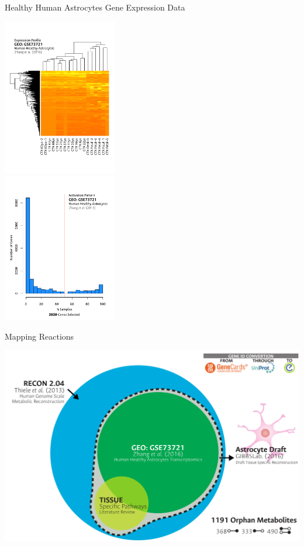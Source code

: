\documentclass[11pt]{beamer}
\begin{document}
\begin{frame}{Healthy Human Astrocytes Gene Expression Data}
\begin{center}
\begin{multicols}{2}
\includegraphics[width=5cm]{GE}\\
\includegraphics[width=5cm]{ActiveGenes}
\end{multicols}
\end{center}
\end{frame}
\begin{frame}{Mapping Reactions}
\begin{center}
\includegraphics[width=\textwidth]{TSR}
\end{center}
\end{frame}
\end{document}
